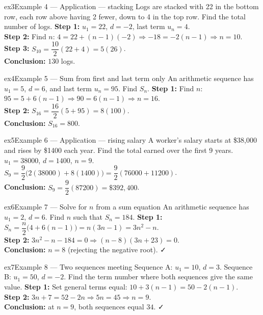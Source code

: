 \documentclass[11pt]{article}
\begin{document}
\begin{example}{ex3}{Example 4 --- Application --- stacking}
Logs are stacked with 22 in the bottom row, each row above having 2 fewer, down to 4 in the top row. Find the total number of logs.\soln
\textbf{Step 1:} $u_1=22$, $d=-2$, last term $u_n=4$.\\[3pt]
\textbf{Step 2:} Find $n$: $4=22+(n-1)(-2)\Rightarrow -18=-2(n-1)\Rightarrow n=10$.\\[3pt]
\textbf{Step 3:} $S_{10}=\dfrac{10}{2}(22+4)=5(26)$.\\[3pt]
\textbf{Conclusion:} $130$ logs.
\end{example}

\begin{example}{ex4}{Example 5 --- Sum from first and last term only}
An arithmetic sequence has $u_1=5$, $d=6$, and last term $u_n=95$. Find $S_n$.\soln
\textbf{Step 1:} Find $n$: $95=5+6(n-1)\Rightarrow 90=6(n-1)\Rightarrow n=16$.\\[3pt]
\textbf{Step 2:} $S_{16}=\dfrac{16}{2}(5+95)=8(100)$.\\[3pt]
\textbf{Conclusion:} $S_{16}=800$.
\end{example}

\begin{example}{ex5}{Example 6 --- Application --- rising salary}
A worker's salary starts at \$38{,}000 and rises by \$1400 each year. Find the total earned over the first 9 years.\soln
$u_1=38000$, $d=1400$, $n=9$. $S_9=\dfrac92\big(2(38000)+8(1400)\big)=\dfrac92(76000+11200)$.\\[3pt]
\textbf{Conclusion:} $S_9=\dfrac92(87200)=\$392{,}400$.
\end{example}

\begin{example}{ex6}{Example 7 --- Solve for $n$ from a sum equation}
An arithmetic sequence has $u_1=2$, $d=6$. Find $n$ such that $S_n=184$.\soln
\textbf{Step 1:} $S_n=\dfrac n2\big(4+6(n-1)\big)=n(3n-1)=3n^2-n$.\\[3pt]
\textbf{Step 2:} $3n^2-n-184=0\Rightarrow(n-8)(3n+23)=0$.\\[3pt]
\textbf{Conclusion:} $n=8$ (rejecting the negative root). ✓
\end{example}

\begin{example}{ex7}{Example 8 --- Two sequences meeting}
Sequence A: $u_1=10$, $d=3$. Sequence B: $u_1=50$, $d=-2$. Find the term number where both sequences give the same value.\soln
\textbf{Step 1:} Set general terms equal: $10+3(n-1)=50-2(n-1)$.\\[3pt]
\textbf{Step 2:} $3n+7=52-2n\Rightarrow5n=45\Rightarrow n=9$.\\[3pt]
\textbf{Conclusion:} at $n=9$, both sequences equal $34$. ✓
\end{example}
\end{document}

